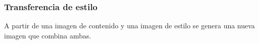 \documentclass[10pt,center]{beamer}
\begin{document}
\begin{frame}
  \frametitle{Transferencia de estilo}
  A partir de una imagen de contenido y una imagen de estilo se genera una nueva imagen que combina ambas.
  \begin{figure}[h]
    \begin{center}
       \hspace{1.0cm}
       \hspace{1.0cm}

\end{center}
\end{figure}
\end{frame}
\end{document}
